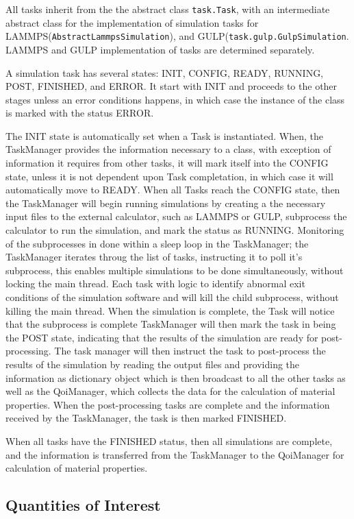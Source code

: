 All tasks inherit from the the abstract class \verb|task.Task|, with an intermediate abstract class for the implementation of simulation tasks for LAMMPS(\verb|AbstractLammpsSimulation|), and GULP(\verb|task.gulp.GulpSimulation|.  LAMMPS and GULP implementation of tasks are determined separately.

A simulation task has several states: INIT, CONFIG, READY, RUNNING, POST, FINISHED, and ERROR.  It start with INIT and proceeds to the other stages unless an error conditions happens, in which case the instance of the class is marked with the status ERROR.

The INIT state is automatically set when a Task is instantiated.  
When, the TaskManager provides the information necessary to a class, with exception of information it requires from other tasks, it will mark itself into the CONFIG state, unless it is not dependent upon Task completation, in which case it will automatically move to READY.   
When all Tasks reach the CONFIG state, then the TaskManager will begin running simulations by creating a the necessary input files to the external calculator, such as LAMMPS or GULP, subprocess the calculator to run the simulation, and mark the status as RUNNING.  
Monitoring of the subprocesses in done within a sleep loop in the TaskManager; the TaskManager iterates throug the list of tasks, instructing it to poll it's subprocess, this enables multiple simulations to be done simultaneously, without locking the main thread.  Each task with logic to identify abnormal exit conditions of the simulation software and will kill the child subprocess, without killing the main thread.
When the simulation is complete, the Task will notice that the subprocess is complete TaskManager will then mark the task in being the POST state, indicating that the results of the simulation are ready for post-processing.  The task manager will then instruct the task to post-process the results of the simulation by reading the output files and providing the information as dictionary object which is then broadcast to all the other tasks as well as the QoiManager, which collects the data for the calculation of material properties.  When the post-processing tasks are complete and the information received by the TaskManager, the task is then marked FINISHED.

When all tasks have the FINISHED status, then all simulations are complete, and the information is transferred from the TaskManager to the QoiManager for calculation of material properties.
\subsection{Quantities of Interest}

